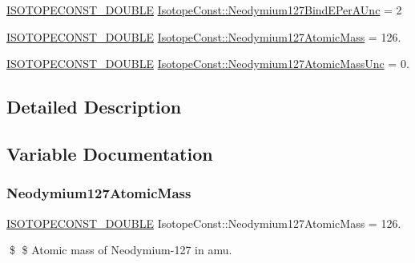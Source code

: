 \begin{DoxyCompactItemize}
\mbox{\hyperlink{group___isotope_const-_macros_ga8f45a7272ce02c0b4c65c44636ed719a}{I\+S\+O\+T\+O\+P\+E\+C\+O\+N\+S\+T\+\_\+\+D\+O\+U\+B\+LE}} \mbox{\hyperlink{group___isotope_const-_neodymium-_nd127_gae0e3f3cb00a535b6f3fb305efa3defdb}{Isotope\+Const\+::\+Neodymium127\+Bind\+E\+Per\+A\+Unc}} = 2
\item 
\mbox{\hyperlink{group___isotope_const-_macros_ga8f45a7272ce02c0b4c65c44636ed719a}{I\+S\+O\+T\+O\+P\+E\+C\+O\+N\+S\+T\+\_\+\+D\+O\+U\+B\+LE}} \mbox{\hyperlink{group___isotope_const-_neodymium-_nd127_gaf7489d2e710f83bf1c6f57188ad7423c}{Isotope\+Const\+::\+Neodymium127\+Atomic\+Mass}} = 126.
\item 
\mbox{\hyperlink{group___isotope_const-_macros_ga8f45a7272ce02c0b4c65c44636ed719a}{I\+S\+O\+T\+O\+P\+E\+C\+O\+N\+S\+T\+\_\+\+D\+O\+U\+B\+LE}} \mbox{\hyperlink{group___isotope_const-_neodymium-_nd127_ga2e742bfc126e6bea03bcdcd0b7f42e1e}{Isotope\+Const\+::\+Neodymium127\+Atomic\+Mass\+Unc}} = 0.
\end{DoxyCompactItemize}


\subsection{Detailed Description}


\subsection{Variable Documentation}
\mbox{\label{group___isotope_const-_neodymium-_nd127_gaf7489d2e710f83bf1c6f57188ad7423c}} 
\subsubsection{\texorpdfstring{Neodymium127\+Atomic\+Mass}{Neodymium127AtomicMass}}
{\footnotesize\ttfamily \mbox{\hyperlink{group___isotope_const-_macros_ga8f45a7272ce02c0b4c65c44636ed719a}{I\+S\+O\+T\+O\+P\+E\+C\+O\+N\+S\+T\+\_\+\+D\+O\+U\+B\+LE}} Isotope\+Const\+::\+Neodymium127\+Atomic\+Mass = 126.}

\$ \$ Atomic mass of Neodymium-\/127 in amu. \mbox{\label{group___isotope_const-_neodymium-_nd127_ga2e742bfc126e6bea03bcdcd0b7f42e1e}} 
